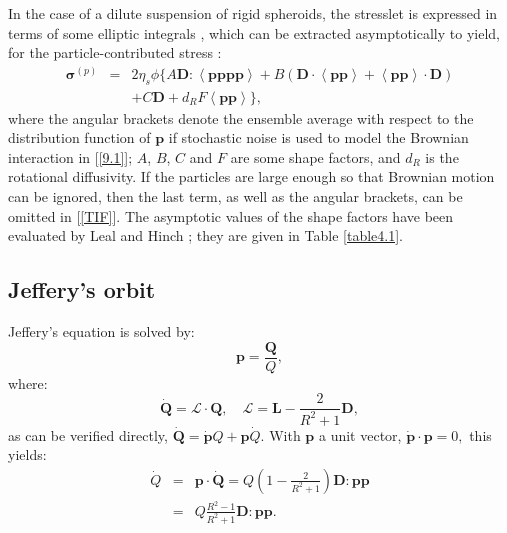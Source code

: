 \documentclass[english,fleqn,allpages]{ISTE_science}[2018/07/30]
\begin{document}
In the case of a dilute suspension of rigid spheroids, the stresslet
is expressed in terms of some elliptic integrals \cite{kim91}, which
can be extracted asymptotically to yield, for the particle-contributed
stress \cite{leal73}: 
\begin{eqnarray}
\mathbf{\sigma}^{(p)} & =&2\eta_{s}\phi\{A\mathbf{D}:\left\langle \mathbf{pppp}\right\rangle +B\left(\mathbf{D}\cdot\left\langle \mathbf{pp}\right\rangle +\left\langle \mathbf{pp}\right\rangle \cdot\mathbf{D}\right)\label{TIF}\\
& & +C\mathbf{D}+d_{R}F\left\langle \mathbf{pp}\right\rangle \},\nonumber 
\end{eqnarray}
where the angular brackets denote the ensemble average with respect
to the distribution function of $\mathbf{p}$ if stochastic noise
is used to model the Brownian interaction in [\ref{9.1}]; $A$,
$B$, $C$ and $F$ are some shape factors, and $d_{R}$ is the rotational
diffusivity. If the particles are large enough so that Brownian motion
can be ignored, then the last term, as well as the angular brackets,
can be omitted in [\ref{TIF}]. The asymptotic values of the shape
factors have been evaluated by Leal and Hinch \cite{leal73}; they
are given in Table \ref{table4.1}.%





\subsection{Jeffery's orbit}

Jeffery's equation is solved by: 
\begin{equation}
\mathbf{p}=\frac{\mathbf{Q}}{Q},
\end{equation}
where: 
\begin{equation}
\mathbf{\dot{Q}}=\mathcal{L}\cdot\mathbf{Q},\quad\mathcal{L}=\mathbf{L}-\frac{2}{R^{2}+1}\mathbf{D},\label{9.2}
\end{equation}
as can be verified directly, $\mathbf{\dot{Q}}=\mathbf{\dot{p}}Q+\mathbf{p}\dot{Q}.$
With $\mathbf{p}$ a unit vector, $\mathbf{\dot{p}\cdot p}=0,$ this
yields:
\begin{eqnarray*}
\dot{Q} & =&\mathbf{p}\cdot\mathbf{\dot{Q}}=Q\left(1-\frac{2}{R^{2}+1}\right)\mathbf{D}:\mathbf{pp}\\
 & =&Q\frac{R^{2}-1}{R^{2}+1}\mathbf{D}:\mathbf{pp.}
\end{eqnarray*}
\end{document}
